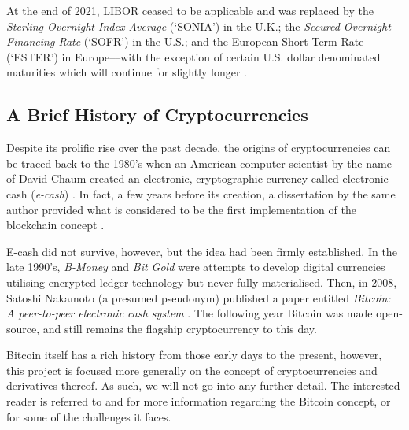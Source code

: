 At the end of 2021, LIBOR ceased to be applicable and was replaced by the \textit{Sterling Overnight Index Average} (`SONIA') in the U.K.; the \textit{Secured Overnight Financing Rate} (`SOFR') in the U.S.; and the European Short Term Rate (`ESTER') in Europe––with the exception of certain U.S. dollar denominated maturities which will continue for slightly longer \citep{FCA_Ch2_2}. 

\subsection{A Brief History of Cryptocurrencies}
Despite its prolific rise over the past decade, the origins of cryptocurrencies can be traced back to the 1980's when an American computer scientist by the name of David Chaum created an electronic, cryptographic currency called electronic cash (\textit{e-cash}) \citep{chaum1983blind}. In fact, a few years before its creation, a dissertation by the same author provided what is considered to be the first implementation of the blockchain concept \citep{chaum1979computer}.

E-cash did not survive, however, but the idea had been firmly established. In the late 1990's, \textit{B-Money} \citep{Bmoney1998} and \textit{Bit Gold} \citep{BitGold1998} were attempts to develop digital currencies utilising encrypted ledger technology but never fully materialised. Then, in 2008, Satoshi Nakamoto (a presumed pseudonym) published a paper entitled \textit{Bitcoin: A peer-to-peer electronic cash system} \citep{nakamoto2008bitcoin}. The following year Bitcoin was made open-source, and still remains the flagship cryptocurrency to this day.

Bitcoin itself has a rich history from those early days to the present, however, this project is focused more generally on the concept of cryptocurrencies and derivatives thereof. As such, we will not go into any further detail. The interested reader is referred to \cite{bohme2015bitcoin} and \cite{zohar2015bitcoin} for more information regarding the Bitcoin concept, or \cite{urquhart2016inefficiency} for some of the challenges it faces. 

